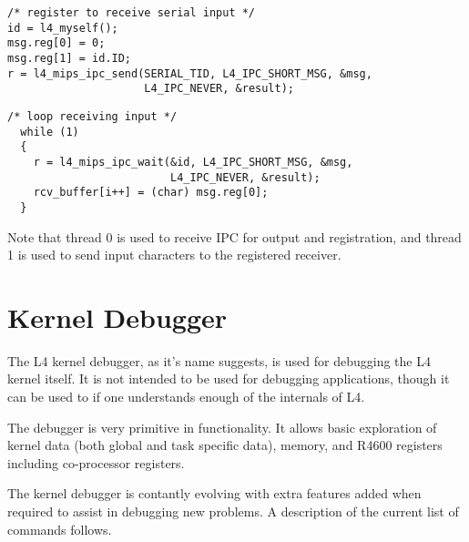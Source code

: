 \documentclass[a4paper,11pt,twoside,dvips]{book}
\begin{document}
{\small
\begin{verbatim}
/* register to receive serial input */
id = l4_myself();
msg.reg[0] = 0;
msg.reg[1] = id.ID; 
r = l4_mips_ipc_send(SERIAL_TID, L4_IPC_SHORT_MSG, &msg,
                     L4_IPC_NEVER, &result);
\end{verbatim}

\begin{verbatim}
/* loop receiving input */
  while (1)
  {
    r = l4_mips_ipc_wait(&id, L4_IPC_SHORT_MSG, &msg,
                         L4_IPC_NEVER, &result);
    rcv_buffer[i++] = (char) msg.reg[0];
  }
\end{verbatim}
}

Note that thread 0 is used to receive IPC for output and registration,
and thread 1 is used to send input characters to the registered
receiver.

\chapter{Kernel Debugger}

The L4 kernel debugger, as it's name suggests, is used for debugging the
L4 kernel itself. It is not intended to be used for debugging
applications, though it can be used to if one understands enough of the
internals of L4.

The debugger is very primitive in functionality. It allows basic
exploration of kernel data (both global and task specific data), memory,
and R4600 registers including co-processor registers.

The kernel debugger is contantly evolving with extra features added when
required to assist in debugging new problems. A description of the
current list of commands follows.
\end{document}
